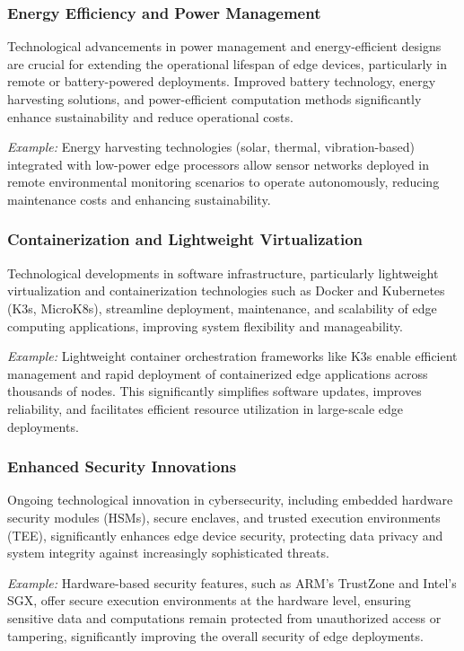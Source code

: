 \documentclass[runningheads]{llncs}
\begin{document}
\subsubsection{Energy Efficiency and Power Management}
Technological advancements in power management and energy-efficient designs are crucial for extending the operational lifespan of edge devices, particularly in remote or battery-powered deployments. Improved battery technology, energy harvesting solutions, and power-efficient computation methods significantly enhance sustainability and reduce operational costs.

\textit{Example:} Energy harvesting technologies (solar, thermal, vibration-based) integrated with low-power edge processors allow sensor networks deployed in remote environmental monitoring scenarios to operate autonomously, reducing maintenance costs and enhancing sustainability.

\subsubsection{Containerization and Lightweight Virtualization}
Technological developments in software infrastructure, particularly lightweight virtualization and containerization technologies such as Docker and Kubernetes (K3s, MicroK8s), streamline deployment, maintenance, and scalability of edge computing applications, improving system flexibility and manageability.

\textit{Example:} Lightweight container orchestration frameworks like K3s enable efficient management and rapid deployment of containerized edge applications across thousands of nodes. This significantly simplifies software updates, improves reliability, and facilitates efficient resource utilization in large-scale edge deployments.

\subsubsection{Enhanced Security Innovations}
Ongoing technological innovation in cybersecurity, including embedded hardware security modules (HSMs), secure enclaves, and trusted execution environments (TEE), significantly enhances edge device security, protecting data privacy and system integrity against increasingly sophisticated threats.

\textit{Example:} Hardware-based security features, such as ARM's TrustZone and Intel's SGX, offer secure execution environments at the hardware level, ensuring sensitive data and computations remain protected from unauthorized access or tampering, significantly improving the overall security of edge deployments.
\end{document}

